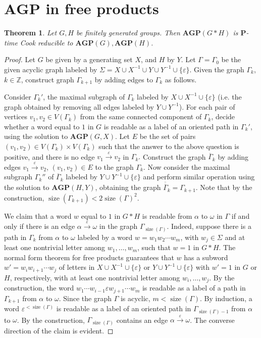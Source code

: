 \documentclass[10pt]{amsart}
\newtheorem{theorem}{Theorem}[section]
\theoremstyle{definition}
\DeclareMathOperator{\size}{{size}}
\def\P{{\mathbf{P}}}
\def\AGP{{\mathbf{AGP}}}
\begin{document}
\section{$\AGP$ in free products}\label{sec:free_prod}
\begin{theorem}\label{th:agp_to_factors}
Let $G,H$ be finitely generated groups. Then $\AGP(G*H)$ is $\P$-time Cook reducible to $\AGP(G),\AGP(H)$.
\end{theorem}
\begin{proof}
Let $G$ be given by a generating set $X$, and $H$ by $Y$. Let $\Gamma=\Gamma_0$ be the given acyclic graph labeled by $\Sigma=X\cup X^{-1}\cup Y\cup Y^{-1}\cup\{\varepsilon\}$. Given the graph $\Gamma_k$, $k\in\mathbb Z$, construct graph $\Gamma_{k+1}$ by adding edges to $\Gamma_k$ as follows.

Consider $\Gamma_{k}'$, the maximal subgraph of $\Gamma_k$ labeled by  $X\cup X^{-1}\cup \{\varepsilon\}$ (i.e. the graph obtained by removing all edges labeled by $Y\cup Y^{-1}$).
For each pair of vertices $v_1,v_2\in V(\Gamma_k)$ from the same connected component of $\Gamma_k$, decide whether a word equal to $1$ in $G$ is readable as a label of an oriented path in $\Gamma_k'$, using the solution to $\AGP(G,X)$.
Let $E$ be the set of pairs $(v_1,v_2)\in V(\Gamma_k)\times V(\Gamma_k)$ such that the answer to the above question is positive, and there is no edge $v_1\overset{\varepsilon}{\to}v_2$ in $\Gamma_k.$ Construct the graph $\overline{\Gamma}_k$ by adding edges  $v_1\overset{\varepsilon}{\to}v_2$, $(v_1,v_2)\in E$ to the graph $\Gamma_k$.
Now consider the maximal subgraph $\Gamma_k''$ of $\overline{\Gamma}_k$ labeled by $Y\cup Y^{-1}\cup \{\varepsilon\}$ and perform similar operation using the solution to $\AGP(H,Y)$, obtaining the graph $\overline{\overline{\Gamma}}_k=\Gamma_{k+1}$.
Note that by the construction, $\size(\Gamma_{k+1})<2\size(\Gamma)^2$.

We claim that a word $w$ equal to $1$ in $G*H$ is readable from $\alpha$ to $\omega$ in $\Gamma$ if and only if there is an edge $\alpha\overset{\varepsilon}{\to}\omega$ in the graph $\Gamma_{\size(\Gamma)}$.
Indeed, suppose there is a path in $\Gamma_k$ from $\alpha$ to $\omega$ labeled by a word $w=w_1w_2\cdots w_m$, with $w_j\in \Sigma$ and at least one nontrivial letter among $w_1,\ldots, w_m$, such that $w=1$ in $G*H$.
The normal form theorem for free products guarantees that $w$ has a subword $w'=w_iw_{i+1}\cdots w_j$ of letters in $X\cup X^{-1}\cup \{\varepsilon\}$ or $Y\cup Y^{-1}\cup \{\varepsilon\}$ with $w'=1$ in $G$ or $H$, respectively, with at least one nontrivial letter among $w_i,\ldots,w_j$.
By the construction, the word $w_1\cdots w_{i-1}\varepsilon w_{j+1}\cdots w_m$ is readable as a label of a path in $\Gamma_{k+1}$ from $\alpha$ to $\omega$. Since the graph $\Gamma$ is acyclic, $m< \size(\Gamma)$.
By induction, a word $\varepsilon^{<\size(\Gamma)}$ is readable as a label of an oriented path in $\Gamma_{\size(\Gamma)-1}$ from $\alpha$ to $\omega$.
By the construction, $\Gamma_{\size(\Gamma)}$ contains an edge $\alpha\overset{\varepsilon}{\to}\omega$.
The converse direction of the claim is evident.
\end{proof}
\end{document}

